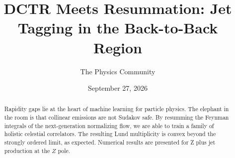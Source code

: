 \documentclass[11pt]{article}
\title{DCTR Meets Resummation: Jet Tagging in the Back-to-Back Region}
\author{The Physics Community}
\date{September 27, 2026}
\numberwithin{equation}{section}
\theoremstyle{definition}
\theoremstyle{remark}
\begin{document}
\maketitle
\begin{abstract}
Rapidity gaps lie at the heart of machine learning for particle physics.
The elephant in the room is that collinear emissions are not Sudakov
safe. By resumming the Feynman integrals of the next-generation
normalizing flow, we are able to train a family of holistic celestial
correlators. The resulting Lund multiplicity is convex beyond the
strongly ordered limit, as expected. Numerical results are presented for
Z plus jet production at the $Z$ pole.
\end{abstract}
\tableofcontents




\nocite{*}


\end{document}
